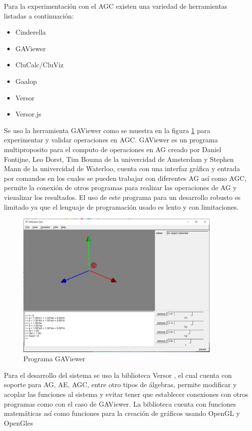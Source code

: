 	Para la experimentación con el AGC existen una variedad de herramientas listadas a continuación:
	\begin{itemize}
		\item Cinderella \cite{Cinderel45:online}
		\item GAViewer \cite{Geometri75:online}
		\item CluCalc/CluViz \cite{CLUCalc12:online}
		\item Gaalop \cite{GaalopGe19:online}
		\item Versor \cite{versor}
		\item Versor.js \cite{versorJswe94:online}
	\end{itemize}
	
	Se uso la herramienta GAViewer como se muestra en la figura \ref{fig:GAViwer} para experimentar y validar operaciones en AGC. GAViewer es un programa multiproposito para el computo de operaciones en AG creado por Daniel Fontijne, Leo Dorst, Tim Bouma de la univercidad de Amsterdam y Stephen Mann de la univercidad de Waterloo, cuenta con una interfaz gráfica y entrada por comandos en los cuales se pueden trabajar con diferentes AG así como AGC, permite la conexión de otros programas para realizar las operaciones de AG y visualizar los resultados. El uso de este programa para un desarrollo robusto es limitado ya que el lenguaje de programación usado es lento y con limitaciones\cite{Geometri75:online}.\\
	
	\begin{figure}[!htb]
		\centering
		\includegraphics[width=0.9\textwidth]{02Desarrollo/AGC/imagenes/GAViewer.JPG}
		\caption{Programa GAViewer}%
		\label{fig:GAViwer}
	\end{figure}
	

	Para el desarrollo del sistema se uso la biblioteca Versor \cite{versor}, el cual cuenta con soporte para AG, AE, AGC, entre otro tipos de álgebras, permite modificar y acoplar las funciones al sistema y evitar tener que establecer conexiones con otros programas como con el caso de GAViewer. La biblioteca cuenta con funciones matemáticas así como funciones para la creación de gráficos usando OpenGL y OpenGles\\
	
